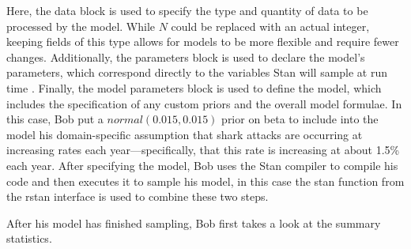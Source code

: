 \documentclass[
  12pt,
  oneside]{book}
\newenvironment{Shaded}{\begin{snugshade}}{\end{snugshade}}
\newcommand{\AttributeTok}[1]{\textcolor[rgb]{0.77,0.63,0.00}{#1}}
\newcommand{\DecValTok}[1]{\textcolor[rgb]{0.00,0.00,0.81}{#1}}
\newcommand{\FunctionTok}[1]{\textcolor[rgb]{0.00,0.00,0.00}{#1}}
\newcommand{\NormalTok}[1]{#1}
\newcommand{\OtherTok}[1]{\textcolor[rgb]{0.56,0.35,0.01}{#1}}
\newcommand{\SpecialCharTok}[1]{\textcolor[rgb]{0.00,0.00,0.00}{#1}}
\newcommand{\StringTok}[1]{\textcolor[rgb]{0.31,0.60,0.02}{#1}}
\theoremstyle{definition}
\theoremstyle{definition}
\theoremstyle{definition}
\theoremstyle{remark}
\begin{document}
Here, the data block is used to specify the type and quantity of data to be processed by the model.
While \(N\) could be replaced with an actual integer, keeping fields of this type allows for models to be more flexible and require fewer changes.
Additionally, the parameters block is used to declare the model's parameters, which correspond directly to the variables Stan will sample at run time \citep[  8.1]{StanManual2016}.
Finally, the model parameters block is used to define the model, which includes the specification of any custom priors and the overall model formulae.
In this case, Bob put a \(normal(0.015,0.015)\) prior on beta to include into the model his domain-specific assumption that shark attacks are occurring at increasing rates each year---specifically, that this rate is increasing at about 1.5\% each year.
After specifying the model, Bob uses the Stan compiler to compile his code and then executes it to sample his model, in this case the stan function from the rstan interface is used to combine these two steps.

\begin{Shaded}
\end{Shaded}

After his model has finished sampling, Bob first takes a look at the summary statistics.

\begin{Shaded}
\end{Shaded}
\end{document}
